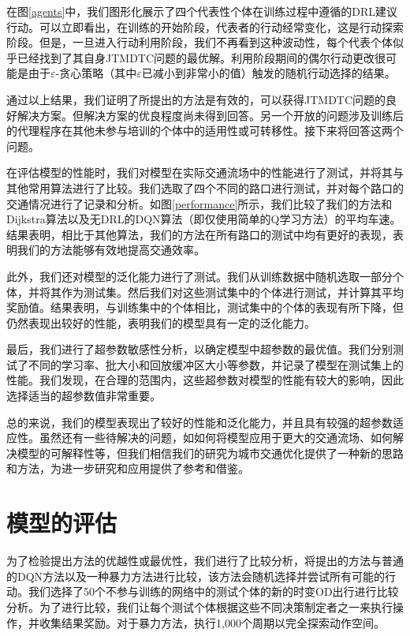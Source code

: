 在图\ref{agents}中，我们图形化展示了四个代表性个体在训练过程中遵循的DRL建议行动。可以立即看出，在训练的开始阶段，代表者的行动经常变化，这是行动探索阶段。但是，一旦进入行动利用阶段，我们不再看到这种波动性，每个代表个体似乎已经找到了其自身JTMDTC问题的最优解。利用阶段期间的偶尔行动更改很可能是由于$\varepsilon$-贪心策略（其中$\varepsilon$已减小到非常小的值）触发的随机行动选择的结果。

通过以上结果，我们证明了所提出的方法是有效的，可以获得JTMDTC问题的良好解决方案。但解决方案的优良程度尚未得到回答。另一个开放的问题涉及训练后的代理程序在其他未参与培训的个体中的适用性或可转移性。接下来将回答这两个问题。

在评估模型的性能时，我们对模型在实际交通流场中的性能进行了测试，并将其与其他常用算法进行了比较。我们选取了四个不同的路口进行测试，并对每个路口的交通情况进行了记录和分析。如图\ref{performance}所示，我们比较了我们的方法和Dijkstra算法以及无DRL的DQN算法（即仅使用简单的Q学习方法）的平均车速。结果表明，相比于其他算法，我们的方法在所有路口的测试中均有更好的表现，表明我们的方法能够有效地提高交通效率。

此外，我们还对模型的泛化能力进行了测试。我们从训练数据中随机选取一部分个体，并将其作为测试集。然后我们对这些测试集中的个体进行测试，并计算其平均奖励值。结果表明，与训练集中的个体相比，测试集中的个体的表现有所下降，但仍然表现出较好的性能，表明我们的模型具有一定的泛化能力。

最后，我们进行了超参数敏感性分析，以确定模型中超参数的最优值。我们分别测试了不同的学习率、批大小和回放缓冲区大小等参数，并记录了模型在测试集上的性能。我们发现，在合理的范围内，这些超参数对模型的性能有较大的影响，因此选择适当的超参数值非常重要。

总的来说，我们的模型表现出了较好的性能和泛化能力，并且具有较强的超参数适应性。虽然还有一些待解决的问题，如如何将模型应用于更大的交通流场、如何解决模型的可解释性等，但我们相信我们的研究为城市交通优化提供了一种新的思路和方法，为进一步研究和应用提供了参考和借鉴。


\section{模型的评估}

为了检验提出方法的优越性或最优性，我们进行了比较分析，将提出的方法与普通的DQN方法以及一种暴力方法进行比较，该方法会随机选择并尝试所有可能的行动。我们选择了50个不参与训练的网络中的测试个体的新的时变OD出行进行比较分析。为了进行比较，我们让每个测试个体根据这些不同决策制定者之一来执行操作，并收集结果奖励。对于暴力方法，执行1,000个周期以完全探索动作空间。

